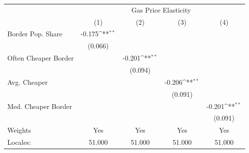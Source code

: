 {
\def\sym#1{\ifmmode^{#1}\else\(^{#1}\)\fi}
\begin{tabular}{l*{4}{c}}
\hline\hline
            &\multicolumn{4}{c}{Gas Price Elasticity}                                               \\
            &\multicolumn{1}{c}{(1)}         &\multicolumn{1}{c}{(2)}         &\multicolumn{1}{c}{(3)}         &\multicolumn{1}{c}{(4)}         \\
\hline
Border Pop. Share&      -0.175\sym{**} &                     &                     &                     \\
            &     (0.066)         &                     &                     &                     \\
[1em]
Often Cheaper Border&                     &      -0.201\sym{**} &                     &                     \\
            &                     &     (0.094)         &                     &                     \\
[1em]
Avg. Cheaper&                     &                     &      -0.206\sym{**} &                     \\
            &                     &                     &     (0.091)         &                     \\
[1em]
Med. Cheaper Border&                     &                     &                     &      -0.201\sym{**} \\
            &                     &                     &                     &     (0.091)         \\
\hline
Weights     &         Yes         &         Yes         &         Yes         &         Yes         \\
Locales:    &      51.000         &      51.000         &      51.000         &      51.000         \\
\hline\hline
\end{tabular}
}
